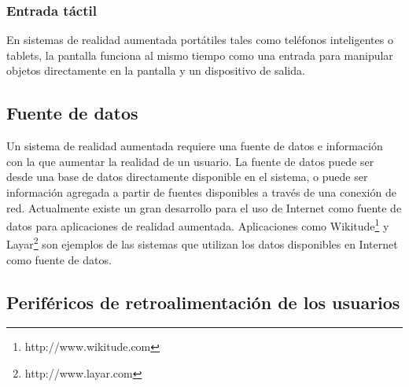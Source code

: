 \subsubsection{Entrada táctil}
En sistemas de realidad aumentada portátiles tales como teléfonos inteligentes o tablets, la pantalla funciona al mismo tiempo como una entrada para manipular objetos directamente en la pantalla y un dispositivo de salida.

\subsection{Fuente de datos}
Un sistema de realidad aumentada requiere una fuente de datos e información con la que aumentar la realidad de un usuario. La fuente de datos puede ser desde una base de datos directamente disponible en el sistema, o puede ser información agregada a partir de fuentes disponibles a través de una conexión de red. Actualmente existe un gran desarrollo para el uso de Internet como fuente de datos para aplicaciones de realidad aumentada. Aplicaciones como Wikitude\footnote{http://www.wikitude.com} y Layar\footnote{http://www.layar.com} son ejemplos de las sistemas que utilizan los datos disponibles en Internet como fuente de datos.

\subsection{Periféricos de retroalimentación de los usuarios}
